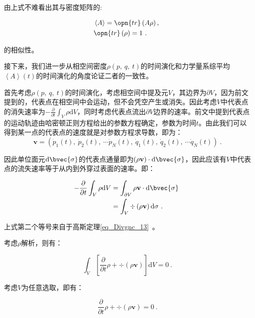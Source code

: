 由上式不难看出其与密度矩阵的:

\begin{equation}
\begin{aligned}
&\left\langle A \right\rangle = \opn{tr}\left(A\rho\right), \\
& \opn{tr}\left(\rho\right)=1~.
\end{aligned}~
\end{equation}

的相似性。

接下来，我们进一步从相空间密度$\rho\left(p,~q,~t\right)$的时间演化和力学量系综平均$\left \langle A \right\rangle\left(t\right)$的时间演化的角度论证二者的一致性。

首先考虑$\rho\left(p,~q,~t\right)$的时间演化，考虑相空间中提及元$V$，其边界为$\partial V$，因为前文提到的，代表点在相空间中会运动，但不会凭空产生或消失。因此考虑$V$中代表点的消失速率为$-\frac{\partial}{\partial t}\int_V \rho \mathrm{d}V$，同时考虑代表点流出$\partial V$边界的速率。前文中提到代表点的运动轨迹由哈密顿正则方程给出的参数方程确定，参数为时间$t$。由此我们可以得到某一点的代表点的速度就是对参数方程求导数，即为：$$\mathbf{v} = \left(\dot{p}_1(t),~\dot{p}_2(t),~\cdots \dot{p}_N(t),~\dot{q}_1(t),~\dot{q}_2(t),~\cdots \dot{q}_N(t)\right)~.$$

因此单位面元$\mathrm{d}\bvec{\sigma}$的代表点通量即为$\left(\rho\mathbf{v}\right)\cdot \mathrm{d}\bvec{\sigma}$，因此应该有$V$中代表点的流失速率等于从内到外穿过表面的速率。即：

\begin{equation}
\begin{aligned}
-\frac{\partial}{\partial t}\int_V \rho \mathrm{d}V &= \int_{\partial V}\rho\mathbf{v}\cdot \mathrm{d}\bvec{\sigma} \\
&=\int_V\div\left(\rho\mathbf{v}\right)\mathrm{d}\sigma~.
\end{aligned}~
\end{equation}

上式第二个等号来自于高斯定理\autoref{eq_Divgnc_13}~。

考虑$\rho$解析，则有：

$$\int_V \left[\frac{\partial}{\partial t}\rho +\div\left(\rho\mathbf{v}\right)\right]\mathrm{d}V  = 0~.$$

考虑$V$为任意选取，即有：

\begin{equation}\label{eq_denMat_8}
\frac{\partial}{\partial t}\rho +\div\left(\rho\mathbf{v}\right)= 0~.
\end{equation}


